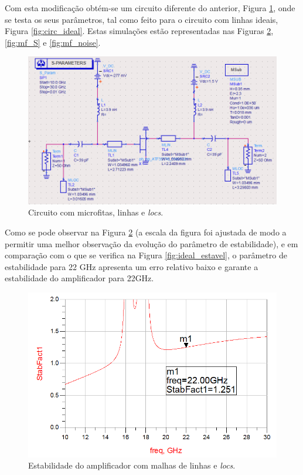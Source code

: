 \documentclass[11pt]{article}
\numberwithin{equation}{section}
\begin{document}
Com esta modificação obtém-se um circuito diferente do anterior, Figura \ref{fig:circuito_mf}, onde se testa os seus parâmetros, tal como feito para o circuito com linhas ideais, Figura \ref{fig:circ_ideal}. Estas simulações estão representadas nas Figuras \ref{fig:mf_est}, \ref{fig:mf_S} e \ref{fig:mf_noise}.

\begin{figure}[H]
	\centering
	\includegraphics[keepaspectratio=true, scale=0.41]{exps/Circuito_mf}
	\vspace{-0.5em}
	\caption{Circuito com microfitas, linhas e \textit{locs}.}
	\vspace{-0.8em}
	\label{fig:circuito_mf}
\end{figure}

Como se pode observar na Figura \ref{fig:mf_est} (a escala da figura foi ajustada de modo a permitir uma melhor observação da evolução do parâmetro de estabilidade), e em comparação com o que se verifica na Figura \ref{fig:ideal_estavel}, o parâmetro de estabilidade para 22 GHz apresenta um erro relativo baixo e garante a estabilidade do amplificador para 22GHz.


\begin{figure}[H]
	\centering
	\includegraphics[keepaspectratio=true, scale=0.41]{exps/mf_estab}
	\vspace{-0.5em}
	\caption{Estabilidade do amplificador com malhas de linhas e \textit{locs}.}
	\vspace{-0.8em}
	\label{fig:mf_est}
\end{figure}
\end{document}
